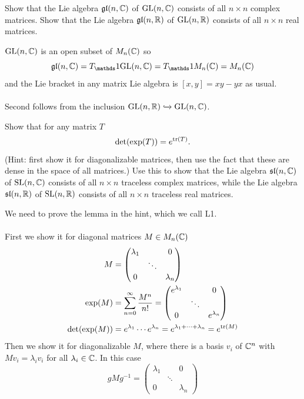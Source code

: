 \documentclass[10pt]{article}
\begin{document}
\begin{example}
	Show that the Lie algebra $\mathfrak{gl}(n,\mathbb{C})$ of $\text{GL}(n,\mathbb{C})$ consists of all $n \times n$ complex matrices. Show that the Lie algebra $\mathfrak{gl}(n,\mathbb{R})$ of $\text{GL}(n,\mathbb{R})$ consists of all $n \times n$ real matrices.
\end{example}
\sol $\text{GL}(n,\mathbb{C})$  is an open subset of $M_n(\mathbb{C})$ so
$$
\mf{gl}(n,\C) = T_\id\GL(n,\C) = T_\id M_n(\C) = M_n(\C)
$$
and the Lie bracket in any matrix Lie algebra is $[x,y]=xy-yx$ as usual.\\\\
Second follows from the inclusion $\text{GL}(n,\mathbb{R}) \xhookrightarrow{} \text{GL}(n,\mathbb{C})$.


\begin{example}\label{b2e39}
	Show that for any matrix $T$
	$$
	\det(\exp(T)) = e^{\tr(T)}.
	$$
	(Hint: first show it for diagonalizable matrices, then use the fact that these are dense in the space of all matrices.) Use this to show that the Lie algebra $\mathfrak{sl}(n,\mathbb{C})$ of $\text{SL}(n,\mathbb{C})$ consists of all $n \times n$ traceless complex matrices, while the Lie algebra $\mathfrak{sl}(n,\mathbb{R})$ of $\text{SL}(n,\mathbb{R})$ consists of all $n \times n$ traceless real matrices.
\end{example}
\sol We need to prove the lemma in the hint, which we call L1.\\\\
First we show it for diagonal matrices $M\in M_n(\mathbb{C})$
$$
\begin{aligned}
	M&=\begin{pmatrix}
		\lambda_1&&0\\
		&\ddots&\\
		0&&\lambda_n	
	\end{pmatrix}\\
	\exp(M) &= \sum_{n=0}^{\infty} \frac{M^n}{n!} = \begin{pmatrix}
		e^{\lambda_1}&&0\\
		&\ddots&\\
		0&&e^{\lambda_n}	
	\end{pmatrix}\\
	\det(\exp(M)) &= e^{\lambda_1}\cdots e^{\lambda_n} = e^{\lambda_1+\cdots+\lambda_n} = e^{\tr(M)}
\end{aligned}
$$
Then we show it for diagonalizable $M$, where there is a basis $v_i$ of $\mathbb{C}^n$ with $Mv_i=\lambda_iv_i$ for all $\lambda_i \in \mathbb{C}$. In this case
$$
gMg^{-1}=\begin{pmatrix}
	\lambda_1&&0\\
	&\ddots&\\
	0&&\lambda_n	
\end{pmatrix}
$$
\end{document}
